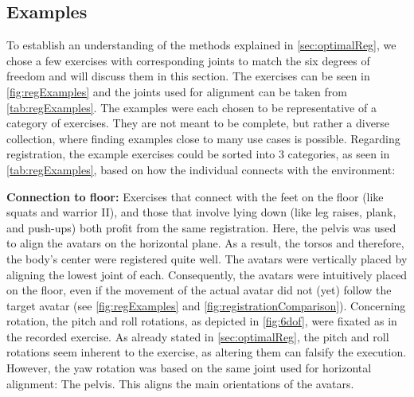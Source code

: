 \subsection*{Examples \label{sec:regExamples}}
To establish an understanding of the methods explained in \autoref{sec:optimalReg}, we chose a few exercises with corresponding joints to match the six degrees of freedom and will discuss them in this section. The exercises can be seen in \autoref{fig:regExamples} and the joints used for alignment can be taken from \autoref{tab:regExamples}. The examples were each chosen to be representative of a category of exercises. They are not meant to be complete, but rather a diverse collection, where finding examples close to many use cases is possible. Regarding registration, the example exercises could be sorted into 3 categories, as seen in \autoref{tab:regExamples}, based on how the individual connects with the environment:

\textbf{Connection to floor:}
Exercises that connect with the feet on the floor (like squats and warrior II), and those that involve lying down (like leg raises, plank, and push-ups) both profit from the same registration. Here, the pelvis was used to align the avatars on the horizontal plane. As a result, the torsos and therefore, the body's center were registered quite well. The avatars were vertically placed by aligning the lowest joint of each. Consequently, the avatars were intuitively placed on the floor, even if the movement of the actual avatar did not (yet) follow the target avatar (see \autoref{fig:regExamples} and \autoref{fig:registrationComparison}). Concerning rotation, the pitch and roll rotations, as depicted in \autoref{fig:6dof}, were fixated as in the recorded exercise. As already stated in \autoref{sec:optimalReg}, the pitch and roll rotations seem inherent to the exercise, as altering them can falsify the execution. However, the yaw rotation was based on the same joint used for horizontal alignment: The pelvis. This aligns the main orientations of the avatars.

